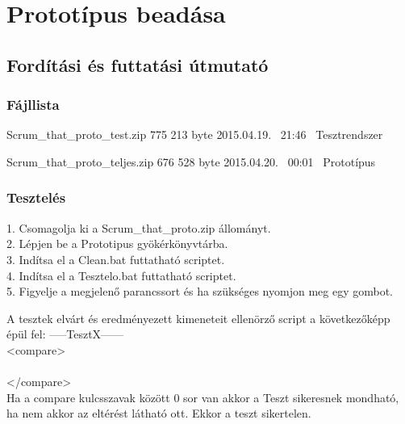 %
\chapter{Prototípus beadása}

\thispagestyle{fancy}

\section{Fordítási és futtatási útmutató}

\subsection{Fájllista}

\begin{fajllista}

\fajl
{Scrum\_that\_proto\_test.zip} %
{775 213 byte} 
{2015.04.19. ~21:46~} 
{Tesztrendszer} 

\fajl
{Scrum\_that\_proto\_teljes.zip} %
{676 528 byte} 
{2015.04.20. ~00:01~} 
{Prototípus} 

\end{fajllista}

\subsection{Tesztelés}

1. Csomagolja ki a Scrum\_that\_proto.zip állományt.\\
2. Lépjen be a Prototipus gyökérkönyvtárba.\\
3. Indítsa el a Clean.bat futtatható scriptet.\\
4. Indítsa el a Tesztelo.bat futtatható scriptet.\\
5. Figyelje a megjelenő parancssort és ha szükséges nyomjon meg egy gombot.\newline

A tesztek elvárt és eredményezett kimeneteit ellenörző script a következőképp épül fel:\newline
-----TesztX------\\
<compare>\\
\\
</compare>\\

Ha a compare kulcsszavak között 0 sor van akkor a Teszt sikeresnek mondható, ha nem akkor az eltérést látható ott. Ekkor a teszt sikertelen.

